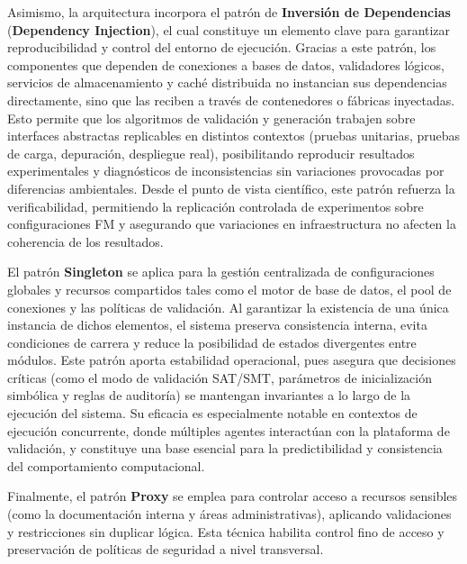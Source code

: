 {{        Asimismo, la arquitectura incorpora el patrón de \textbf{Inversión de Dependencias} (\textbf{Dependency Injection}), 
        el cual constituye un elemento clave para garantizar reproducibilidad y control del entorno de 
        ejecución. Gracias a este patrón, los componentes que dependen de conexiones a bases de datos, 
        validadores lógicos, servicios de almacenamiento y caché distribuida no instancian sus dependencias 
        directamente, sino que las reciben a través de contenedores o fábricas inyectadas. Esto permite que 
        los algoritmos de validación y generación trabajen sobre interfaces abstractas replicables en 
        distintos contextos (pruebas unitarias, pruebas de carga, depuración, despliegue real), posibilitando 
        reproducir resultados experimentales y diagnósticos de inconsistencias sin variaciones provocadas por 
        diferencias ambientales. Desde el punto de vista científico, este patrón refuerza la verificabilidad, 
        permitiendo la replicación controlada de experimentos sobre configuraciones \ac{FM} y asegurando que 
        variaciones en infraestructura no afecten la coherencia de los resultados.

        El patrón \textbf{Singleton} se aplica para la gestión centralizada de configuraciones globales y 
        recursos compartidos tales como el motor de base de datos, el pool de conexiones y las políticas de 
        validación. Al garantizar la existencia de una única instancia de dichos elementos, el sistema preserva 
        consistencia interna, evita condiciones de carrera y reduce la posibilidad de estados divergentes entre 
        módulos. Este patrón aporta estabilidad operacional, pues asegura que decisiones críticas (como el modo 
        de validación \ac{SAT}/\ac{SMT}, parámetros de inicialización simbólica y reglas de auditoría) se mantengan 
        invariantes a lo largo de la ejecución del sistema. Su eficacia es especialmente notable en contextos 
        de ejecución concurrente, donde múltiples agentes interactúan con la plataforma de validación, y 
        constituye una base esencial para la predictibilidad y consistencia del comportamiento computacional.

        Finalmente, el patrón \textbf{Proxy} se emplea para controlar acceso a recursos sensibles 
        (como la documentación interna y áreas administrativas), aplicando validaciones y 
        restricciones sin duplicar lógica. Esta técnica habilita control fino de acceso y 
        preservación de políticas de seguridad a nivel transversal.

}}
